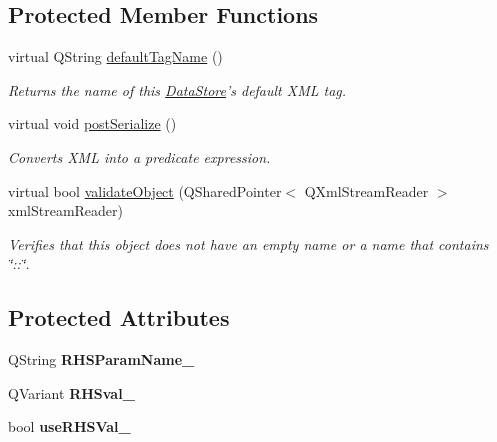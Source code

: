 \subsection*{Protected Member Functions}
\begin{DoxyCompactItemize}
\item 
virtual Q\-String \hyperlink{class_picto_1_1_predicate_expression_a9c85b8264a17fac83074d7954751183b}{default\-Tag\-Name} ()
\begin{DoxyCompactList}\small\item\em Returns the name of this \hyperlink{class_picto_1_1_data_store}{Data\-Store}'s default X\-M\-L tag. \end{DoxyCompactList}\item 
virtual void \hyperlink{class_picto_1_1_predicate_expression_a5457cc58cb7020d12c304ec1281ebffc}{post\-Serialize} ()
\begin{DoxyCompactList}\small\item\em Converts X\-M\-L into a predicate expression. \end{DoxyCompactList}\item 
\hypertarget{class_picto_1_1_predicate_expression_a0f94f40e7cbc20b22744fb3efe577dc1}{virtual bool \hyperlink{class_picto_1_1_predicate_expression_a0f94f40e7cbc20b22744fb3efe577dc1}{validate\-Object} (Q\-Shared\-Pointer$<$ Q\-Xml\-Stream\-Reader $>$ xml\-Stream\-Reader)}\label{class_picto_1_1_predicate_expression_a0f94f40e7cbc20b22744fb3efe577dc1}

\begin{DoxyCompactList}\small\item\em Verifies that this object does not have an empty name or a name that contains \char`\"{}\-::\char`\"{}. \end{DoxyCompactList}\end{DoxyCompactItemize}
\subsection*{Protected Attributes}
\begin{DoxyCompactItemize}
\item 
\hypertarget{class_picto_1_1_predicate_expression_a2514dd406ef55be369cdb2c726cefef2}{Q\-String {\bfseries R\-H\-S\-Param\-Name\-\_\-}}\label{class_picto_1_1_predicate_expression_a2514dd406ef55be369cdb2c726cefef2}

\item 
\hypertarget{class_picto_1_1_predicate_expression_acb4ee01fcaaba117db5a6dc784a7b340}{Q\-Variant {\bfseries R\-H\-Sval\-\_\-}}\label{class_picto_1_1_predicate_expression_acb4ee01fcaaba117db5a6dc784a7b340}

\item 
\hypertarget{class_picto_1_1_predicate_expression_ae1a33b7daf74b0e9dc5fb5400ae83293}{bool {\bfseries use\-R\-H\-S\-Val\-\_\-}}\label{class_picto_1_1_predicate_expression_ae1a33b7daf74b0e9dc5fb5400ae83293}

\end{DoxyCompactItemize}
